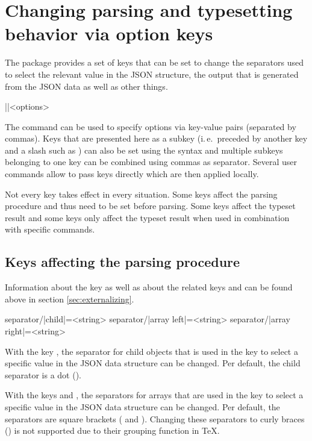 \documentclass[a4paper]{article}
\begin{document}
{{\section{Changing parsing and typesetting behavior via option keys}\label{sec:options}

The package provides a set of keys that can be set to change the separators used to select the relevant value in the JSON structure, the output that is generated from the JSON data as well as other things.

\begin{macrodef}
|\JSONParseSet|{<options>}
\end{macrodef}
The command \macro{\JSONParseSet} can be used to specify options via key-value pairs (separated by commas). Keys that are presented here as a subkey (i.\,e.\ preceded by another key and a slash such as ) can also be set using the syntax  and multiple subkeys belonging to one key can be combined using commas as separator. Several user commands allow to pass keys directly which are then applied locally.

Not every key takes effect in every situation. Some keys affect the parsing procedure and thus need to be set before parsing. Some keys affect the typeset result and some keys only affect the typeset result when used in combination with specific commands.

\subsection{Keys affecting the parsing procedure}

Information about the key  as well as about the related keys  and  can be found above in section \ref{sec:externalizing}.

\begin{macrodef}
separator/|child|={<string>}
separator/|array left|={<string>}
separator/|array right|={<string>}
\end{macrodef}
With the key , the separator for child objects that is used in the key to select a specific value in the JSON data structure can be changed. Per default, the child separator is a dot ().

With the keys  and , the separators for arrays that are used in the key to select a specific value in the JSON data structure can be changed. Per default, the separators are square brackets (\macro{[} and \macro{]}). Changing these separators to curly braces (\macro{{}}) is not supported due to their grouping function in TeX.

}}
\end{document}
